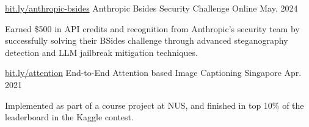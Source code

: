 


\begin{cventries}
   \cventry
    {\href{https://bit.ly/anthropic-bsides}{bit.ly/anthropic-bsides}}
    {Anthropic Bsides Security Challenge} %
    {Online} %
    {May. 2024} %
    {
      \begin{cvitems} %
        \item {Earned \$500 in API credits and recognition from Anthropic's security team by successfully solving their BSides challenge through advanced steganography detection and LLM jailbreak mitigation techniques.}
      \end{cvitems}
    }

  \cventry
    {\href{https://bit.ly/attention-image-captioning}{bit.ly/attention}}
    {End-to-End Attention based Image Captioning} %
    {Singapore} %
    {Apr. 2021} %
    {
      \begin{cvitems} %
        \item {Implemented as part of a course project at NUS, and finished in top 10\% of the leaderboard in the Kaggle contest. }
      \end{cvitems}
    }

\end{cventries}
